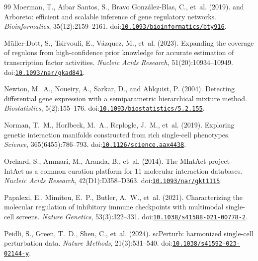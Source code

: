 \begin{thebibliography}{99}
Moerman, T., Aibar Santos, S., Bravo Gonz{\'a}lez-Blas, C., et~al. (2019).
 and {Arboreto}: efficient and scalable inference of gene regulatory networks.
\newblock \emph{Bioinformatics}, 35(12):2159--2161.
\newblock doi:\href{https://doi.org/10.1093/bioinformatics/bty916}{\nolinkurl{10.1093/bioinformatics/bty916}}.

M{\"u}ller-Dott, S., Tsirvouli, E., V{\'a}zquez, M., et~al. (2023).
\newblock Expanding the coverage of regulons from high-confidence prior knowledge for accurate estimation of transcription factor activities.
\newblock \emph{Nucleic Acids Research}, 51(20):10934--10949.
\newblock doi:\href{https://doi.org/10.1093/nar/gkad841}{\nolinkurl{10.1093/nar/gkad841}}.

Newton, M.~A., Noueiry, A., Sarkar, D., and Ahlquist, P. (2004).
\newblock Detecting differential gene expression with a semiparametric hierarchical mixture method.
\newblock \emph{Biostatistics}, 5(2):155--176.
\newblock doi:\href{https://doi.org/10.1093/biostatistics/5.2.155}{\nolinkurl{10.1093/biostatistics/5.2.155}}.

Norman, T.~M., Horlbeck, M.~A., Replogle, J.~M., et~al. (2019).
\newblock Exploring genetic interaction manifolds constructed from rich single-cell phenotypes.
\newblock \emph{Science}, 365(6455):786--793.
\newblock doi:\href{https://doi.org/10.1126/science.aax4438}{\nolinkurl{10.1126/science.aax4438}}.

Orchard, S., Ammari, M., Aranda, B., et~al. (2014).
\newblock The MIntAct project---IntAct as a common curation platform for 11 molecular interaction databases.
\newblock \emph{Nucleic Acids Research}, 42(D1):D358--D363.
\newblock doi:\href{https://doi.org/10.1093/nar/gkt1115}{\nolinkurl{10.1093/nar/gkt1115}}.

Papalexi, E., Mimitou, E.~P., Butler, A.~W., et~al. (2021).
\newblock Characterizing the molecular regulation of inhibitory immune checkpoints with multimodal single-cell screens.
\newblock \emph{Nature Genetics}, 53(3):322--331.
\newblock doi:\href{https://doi.org/10.1038/s41588-021-00778-2}{\nolinkurl{10.1038/s41588-021-00778-2}}.

Peidli, S., Green, T.~D., Shen, C., et~al. (2024).
\newblock sc{P}erturb: harmonized single-cell perturbation data.
\newblock \emph{Nature Methods}, 21(3):531--540.
\newblock doi:\href{https://doi.org/10.1038/s41592-023-02144-y}{\nolinkurl{10.1038/s41592-023-02144-y}}.


\end{thebibliography}
